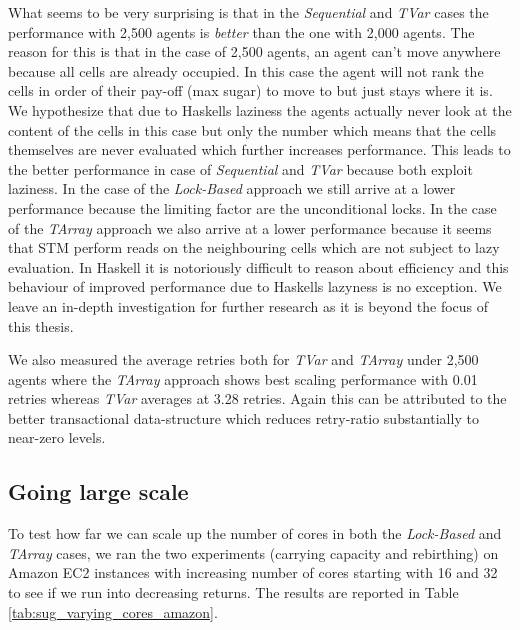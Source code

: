 What seems to be very surprising is that in the \textit{Sequential} and \textit{TVar} cases the performance with 2,500 agents is \textit{better} than the one with 2,000 agents. The reason for this is that in the case of 2,500 agents, an agent can't move anywhere because all cells are already occupied. In this case the agent will not rank the cells in order of their pay-off (max sugar) to move to but just stays where it is. We hypothesize that due to Haskells laziness the agents actually never look at the content of the cells in this case but only the number which means that the cells themselves are never evaluated which further increases performance. This leads to the better performance in case of \textit{Sequential} and \textit{TVar} because both exploit laziness.
In the case of the \textit{Lock-Based} approach we still arrive at a lower performance because the limiting factor are the unconditional locks. In the case of the \textit{TArray} approach we also arrive at a lower performance because it seems that STM perform reads on the neighbouring cells which are not subject to lazy evaluation. In Haskell it is notoriously difficult to reason about efficiency and this behaviour of improved performance due to Haskells lazyness is no exception. We leave an in-depth investigation for further research as it is beyond the focus of this thesis.

We also measured the average retries both for \textit{TVar} and \textit{TArray} under 2,500 agents where the \textit{TArray} approach shows best scaling performance with 0.01 retries whereas \textit{TVar} averages at 3.28 retries. Again this can be attributed to the better transactional data-structure which reduces retry-ratio substantially to near-zero levels.

\subsection{Going large scale}
To test how far we can scale up the number of cores in both the \textit{Lock-Based} and \textit{TArray} cases, we ran the two experiments (carrying capacity and rebirthing) on Amazon EC2 instances with increasing number of cores starting with 16 and 32 to see if we run into decreasing returns. The results are reported in Table \ref{tab:sug_varying_cores_amazon}.

